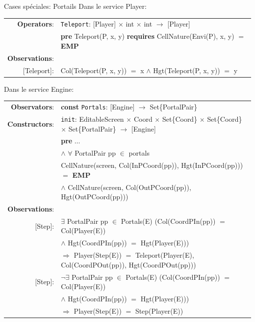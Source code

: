 \documentclass[aspectratio=169]{beamer}
\begin{document}
\begin{frame}{Cases spéciales: Portails}
  Dans le service \textrm{Player}:
  \begin{longtable}{rl}
    \textbf{Operators}: & \texttt{Teleport}: \textrm{[Player]} $\times$ \textrm{int} $\times$ \textrm{int} $\rightarrow$ \textrm{[Player]}\\
    & \quad \textbf{pre} \textrm{Teleport(P, x, y)} \textbf{requires} \textrm{CellNature(Envi(P), x, y)} $=$ \textbf{EMP}\\
    \textbf{Observations}:&\\
    \textrm{[Teleport]}:& \textrm{Col(Teleport(P, x, y))} $=$ x $\land$ \textrm{Hgt(Teleport(P, x, y))} $=$ y\\
  \end{longtable}

Dans le service \textrm{Engine}:
  \begin{longtable}{rl}
    \textbf{Observators}: & \textbf{const} \texttt{Portals}: \textrm{[Engine]} $\rightarrow$ \textrm{Set\{PortalPair\}} \\
    \textbf{Constructors}: &\texttt{init}: \textrm{EditableScreen} $\times$ \textrm{Coord} $\times$ \textrm{Set\{Coord\}} $\times$ \textrm{Set\{Coord\}} $\times$ \textrm{Set\{PortalPair\}} $\rightarrow$ \textrm{[Engine]} \\
      & \quad \textbf{pre} $\ldots$\\
    & \quad\quad\quad $\land$ $\forall$ \textrm{PortalPair} pp $\in$ \textrm{portals}\\
    & \quad\quad\quad\quad\quad \textrm{CellNature(screen, Col(InPCoord(pp)), Hgt(InPCoord(pp)))} $=$ \textbf{EMP}\\
    & \quad\quad\quad\quad\quad $\land$ \textrm{CellNature(screen, Col(OutPCoord(pp)), Hgt(OutPCoord(pp)))}\\
    \textbf{Observations}: &\\
    \textrm{[Step]}: & $\exists$ \textrm{PortalPair} pp $\in$ \textrm{Portals(E)} (\textrm{Col(CoordPIn(pp))} $=$ \textrm{Col(Player(E))} \\
    & \quad\quad $\land$ \textrm{Hgt(CoordPIn(pp))} $=$ \textrm{Hgt(Player(E))})\\
    & \quad\quad $\Rightarrow$ \textrm{Player(Step(E))} $=$ \textrm{Teleport(Player(E), Col(CoordPOut(pp)), Hgt(CoordPOut(pp)))}\\
    \textrm{[Step]}: & $\neg\exists$ \textrm{PortalPair} pp $\in$ \textrm{Portals(E)} (\textrm{Col(CoordPIn(pp))} $=$ \textrm{Col(Player(E))}\\
    & \quad\quad $\land$ \textrm{Hgt(CoordPIn(pp))} $=$ \textrm{Hgt(Player(E))})\\
    & \quad\quad $\Rightarrow$ \textrm{Player(Step(E))} $=$ \textrm{Step(Player(E))}\\
  \end{longtable}

\end{frame}
\end{document}
